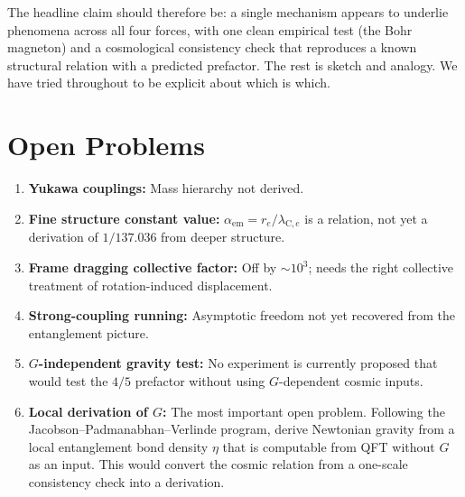 \documentclass[11pt,letterpaper]{article}
\newcommand{\lambdace}{\lambda_{\mathrm{C},e}}
\begin{document}
The headline claim should therefore be: a single mechanism appears to
underlie phenomena across all four forces, with one clean empirical
test (the Bohr magneton) and a cosmological consistency check that
reproduces a known structural relation with a predicted prefactor.
The rest is sketch and analogy. We have tried throughout to be
explicit about which is which.

\section{Open Problems}

\begin{enumerate}
  \item \textbf{Yukawa couplings:} Mass hierarchy not derived.
  \item \textbf{Fine structure constant value:} $\alpha_{\mathrm{em}} = r_e/\lambdace$ is a relation, not yet a derivation of $1/137.036$ from deeper structure.
  \item \textbf{Frame dragging collective factor:} Off by $\sim 10^3$; needs the right collective treatment of rotation-induced displacement.
  \item \textbf{Strong-coupling running:} Asymptotic freedom not yet recovered from the entanglement picture.
  \item \textbf{$G$-independent gravity test:} No experiment is currently proposed that would test the $4/5$ prefactor without using $G$-dependent cosmic inputs.
  \item \textbf{Local derivation of $G$:} The most important open problem. Following the Jacobson--Padmanabhan--Verlinde program, derive Newtonian gravity from a local entanglement bond density $\eta$ that is computable from QFT without $G$ as an input. This would convert the cosmic relation from a one-scale consistency check into a derivation.
\end{enumerate}
\end{document}
